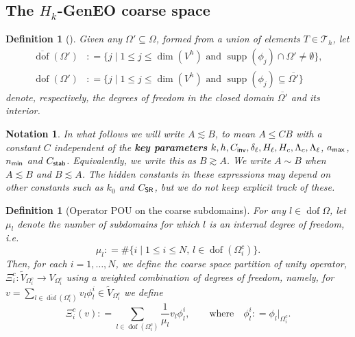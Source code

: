 \documentclass[numbers,webpdf,imaiai]{ima-authoring-template}%
\theoremstyle{thmstyletwo}%
\newtheorem{definition}[theorem]{Definition}
\newtheorem{notation}[theorem]{Notation}
\numberwithin{equation}{section}
\newcommand{\shapereg}{C_{\textup{\textsf{SR}}}}
\newcommand{\Cinv}{C_{\textup{\textsf{inv}}}}
\newcommand{\assign}{\mathrel{\mathop:}=}
\numberwithin{equation}{section}
\DeclareMathOperator{\supp}{supp}
\DeclareMathOperator{\dof}{dof}
\newcommand{\ovdof}{\overline{\dof}}
\newcommand{\Cstab}{C_{\textup{\textsf{stab}}}}
\newcommand{\amax}{a_{\textup{\textsf{max}}}}
\newcommand{\nmin}{n_{\textup{\textsf{min}}}}
\begin{document}
{\subsection[The $H_k$-GenEO coarse space]{The {\boldmath$H_k$}-GenEO coarse space}

\begin{definition}[{\cite[Definition 3.2]{Spillane:2014:ARC}}] \label{Def: 3_2}
Given any $\Omega' \subseteq \Omega$, formed from a union of elements $T \in \mathcal{T}_h$, let 
\begin{align*}
	\ovdof(\Omega') &\assign \bigl\{j \mid 1 \le {j} \le \dim(V^h) \text{ and } \supp(\phi_{j}) \cap \Omega' \ne \emptyset\bigr\},
	\\[0.5ex]
	\dof(\Omega') &\assign \bigl\{j \mid 1 \le j \le \dim(V^h) \text{ and } \supp(\phi_{{j}}) \subseteq \overline{\Omega'}\bigr\}
\end{align*}
denote, respectively,  the  degrees of freedom in the closed domain  $\overline{\Omega'}$ and its interior.
\end{definition}



\begin{notation}\label{notation:sim}
In what follows we will write $A\lesssim B$, to mean $ A \leq C B$ with a constant $C$ independent of the 
\textbf{key parameters} $k,h,\Cinv, \delta_\ell, H_\ell, H_c, \Lambda_c, \Lambda_\ell$, $\amax$, $\nmin$ and $\Cstab$.
Equivalently, we write this as  $B \gtrsim A$. We write $A \sim B$ when $A \lesssim B$ and $B\lesssim A$. 
The hidden constants in these expressions may depend on other constants such as $k_0$ and $\shapereg$, 
but we do not keep explicit track of these.
\end{notation}


\begin{definition}[{Operator POU} on the coarse subdomains] \label{def: 2_7}
For any  {$l\in\dof \Omega$}, let $\mu_l$ denote  the number of subdomains for which $l$ is an internal degree of freedom, i.e.\
\begin{equation}
	\mu_l \assign \#\bigl\{i \mid 1 \le i \le N,\, l \in \dof({\Omega}_i^c)\bigr\}{.}
\end{equation}
Then, for each $i = 1, \ldots, N$, we define the coarse space partition of unity operator, 
$\Xi_i^c: \widetilde{V}_{\Omega^c_i} \rightarrow V_{\Omega^c_i}$  
using  a weighted combination of degrees of freedom, namely, for $v=\sum_{l\in\ovdof(\Omega^c_i)} v_l\phi_l^i\in \widetilde{V}_{\Omega^c_i}$ we define
\begin{equation*}
	\Xi_i^c(v) \assign \sum_{l\in\dof(\Omega^c_i)}\frac{1}{\mu_l }v_l \phi_l^i, \qquad \text{where} \quad
	\phi_l^i \assign \phi_l\vert_{\Omega_i^c}. 
\end{equation*}             
\end{definition}

}
\end{document}
